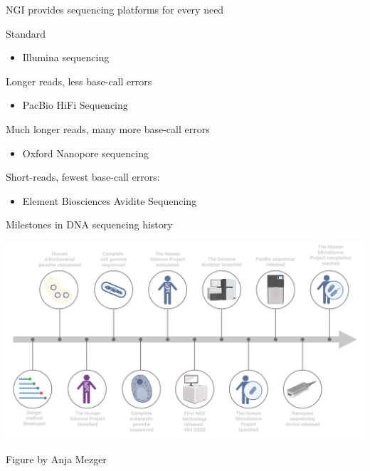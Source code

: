 \documentclass[10pt]{beamer}
\newcommand{\creditdark}[1]{{\vspace{\fill} \par \raggedleft \scriptsize \mdseries \color{scMGray} #1 \par}}
\begin{document}
\begin{frame}{NGI provides sequencing platforms for every need}
	\begin{exampleblock}{Standard}
		\begin{itemize}
			\item Illumina sequencing
		\end{itemize}
	\end{exampleblock}
	\begin{alertblock}{Longer reads, less base-call errors}
	\begin{itemize}
		\item PacBio HiFi Sequencing
	\end{itemize}
\end{alertblock}
	\begin{alertblock}{Much longer reads, many more base-call errors}
	\begin{itemize}
		\item Oxford Nanopore sequencing
	\end{itemize}
\end{alertblock}
	\begin{alertblock}{Short-reads, fewest base-call errors:}
		\begin{itemize}
			\item Element Biosciences Avidite Sequencing
		\end{itemize}
	\end{alertblock}
\end{frame}


\begin{frame}[standout]{Milestones in DNA sequencing history}
	\vspace*{-1.1cm}
	\begin{center}
		\hspace*{-1.1cm}
		\includegraphics[width=1.2\textwidth]{./figures/timeline.png}
	\end{center}
	\creditdark{Figure by Anja Mezger}
\end{frame}
\end{document}
